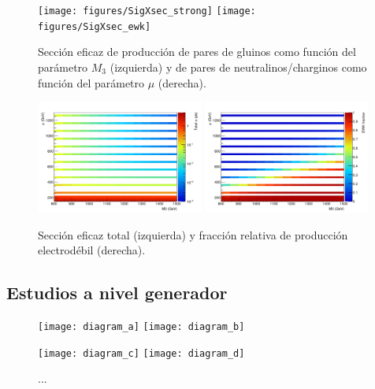 \begin{figure}[!htbp]
  \centering
  \texttt{[image: figures/SigXsec\_strong]}
  \texttt{[image: figures/SigXsec\_ewk]}

  \caption{Sección eficaz de producción de pares de gluinos como función del parámetro $M_3$ (izquierda)
    y de pares de neutralinos/charginos como función del parámetro $\mu$ (derecha).}
  \label{fig:signal_xs}
\end{figure}

\begin{figure}[!htbp]
  \centering
  \includegraphics[width=0.49\textwidth]{figures/SigXsec_total}
  \includegraphics[width=0.49\textwidth]{figures/SigXsec_ewkFrac}
  \caption{Sección eficaz total (izquierda) y fracción relativa
    de producción electrodébil (derecha).}
  \label{fig:signal_xs_total}
\end{figure}



\subsection{Estudios a nivel generador}



\begin{figure}[!htbp]
  \centering

  \texttt{[image: diagram\_a]}
  \texttt{[image: diagram\_b]}

  \texttt{[image: diagram\_c]}
  \texttt{[image: diagram\_d]}

  \caption{...}
  \label{fig:signal_diagrams}

\end{figure}





